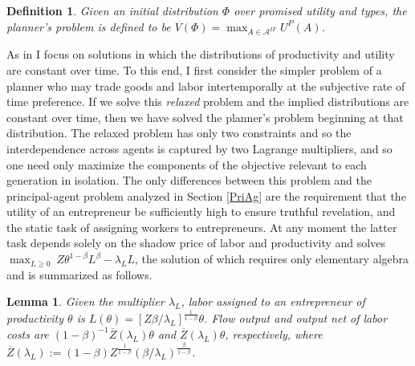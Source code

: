 \documentclass[11pt]{article}
\theoremstyle{plain}
\newtheorem{lemma}[thm]{Lemma}
\newtheorem{defn}{Definition}[section]
\begin{document}
\begin{defn}
Given an initial distribution $\Phi$ over promised utility and types, the planner's problem is defined to be $V(\Phi) = \max_{A \in \mathcal{A}^{IF}} U^P(A)$.
\end{defn} 
As in \cite{farhi_inequality_2007} I focus on solutions in which the distributions of productivity and utility are constant over time. To this end, I first consider the simpler problem of a planner who may trade goods and labor intertemporally at the subjective rate of time preference. If we solve this \textit{relaxed} problem and the implied distributions are constant over time, then we have solved the planner's problem beginning at that distribution. The relaxed problem has only two constraints and so the interdependence across agents is captured by two Lagrange multipliers, and so one need only maximize the components of the objective relevant to each generation in isolation. The only differences between this problem and the principal-agent problem analyzed in Section \ref{PriAg} are the requirement that the utility of an entrepreneur be sufficiently high to ensure truthful revelation, and the static task of assigning workers to entrepreneurs. At any moment the latter task depends solely on the shadow price of labor and productivity and solves $\max_{L \geq 0} \ Z\theta^{1-\beta} L^{\beta} - \lambda_LL$, the solution of which requires only elementary algebra and is summarized as follows. 

\begin{lemma} \label{STATlemma}
Given the multiplier $\lambda_L$, labor assigned to an entrepreneur of productivity $\theta$ is $L(\theta) = [Z\beta/\lambda_L]^{\frac{1}{1-\beta}} \theta$. Flow output and output net of labor costs are $(1-\beta)^{-1}\overline{Z}(\lambda_L)  \theta$ and $\overline{Z}(\lambda_L) \theta$, respectively, where $\overline{Z}(\lambda_L) := (1-\beta)Z^{\frac{1}{1-\beta}}(\beta/\lambda_L)^{\frac{\beta}{1-\beta}}$.
\end{lemma}
\end{document}
